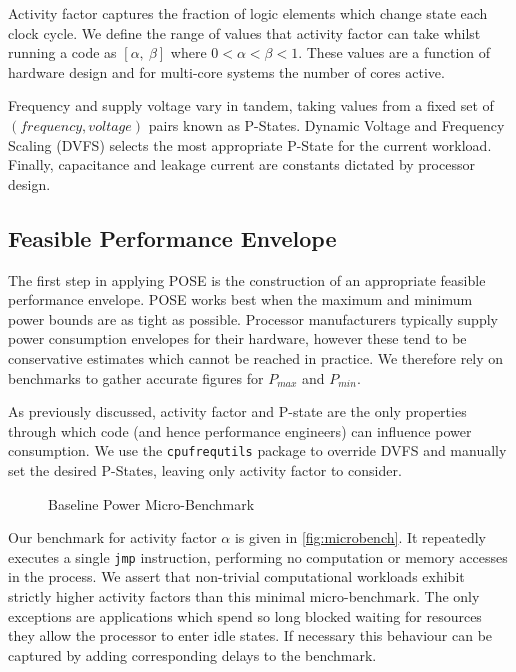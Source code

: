 Activity factor captures the fraction of logic elements which change state each clock cycle.
We define the range of values that activity factor can take whilst running a code as $[\alpha,~\beta]$ where $0 < \alpha < \beta < 1$. These values are a function of hardware design and for multi-core systems the number of cores active.

Frequency and supply voltage vary in tandem, taking values from a fixed set of $(frequency, voltage)$ pairs known as P-States.
Dynamic Voltage and Frequency Scaling (DVFS) selects the most appropriate P-State for the current workload.
Finally, capacitance and leakage current are constants dictated by processor design.

\subsection{Feasible Performance Envelope}
The first step in applying POSE is the construction of an appropriate feasible performance envelope.
POSE works best when the maximum and minimum power bounds are as tight as possible.
Processor manufacturers typically supply power consumption envelopes for their hardware, however these tend to be conservative estimates which cannot be reached in practice.
We therefore rely on benchmarks to gather accurate figures for $P_{max}$ and $P_{min}$.


As previously discussed, activity factor and P-state are the only properties through which code (and hence performance engineers) can influence power consumption.
We use the \texttt{cpufrequtils} package to override DVFS and manually set the desired P-States, leaving only activity factor to consider.

\begin{figure}[ht]                                                               
\centering                                                                      
\lstset{basicstyle=\ttfamily\footnotesize\bfseries, frame=tb} %
              
\caption{Baseline Power Micro-Benchmark}                            
\label{fig:microbench}                                                           
\end{figure}  

Our benchmark for activity factor $\alpha$ is given in \autoref{fig:microbench}.
It repeatedly executes a single \texttt{jmp} instruction, performing no computation or memory accesses in the process.
We assert that non-trivial computational workloads exhibit strictly higher activity factors than this minimal micro-benchmark.
The only exceptions are applications which spend so long blocked waiting for resources they allow the processor to enter idle states.
If necessary this behaviour can be captured by adding corresponding delays to the benchmark.

